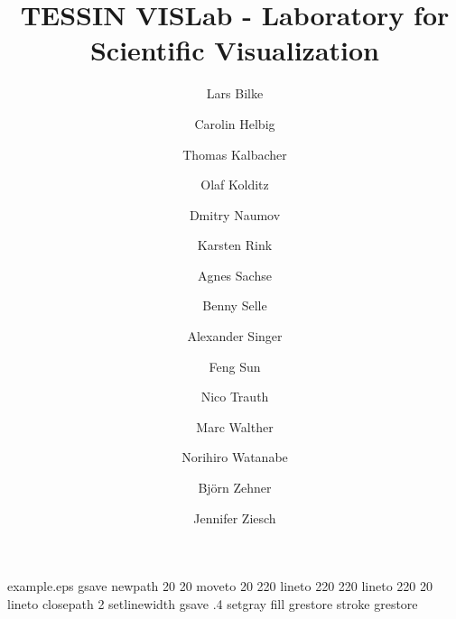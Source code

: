 %
%
%
%
%
\begin{filecontents*}{example.eps}
gsave
newpath
  20 20 moveto
  20 220 lineto
  220 220 lineto
  220 20 lineto
closepath
2 setlinewidth
gsave
  .4 setgray fill
grestore
stroke
grestore
\end{filecontents*}
%
\RequirePackage{fix-cm}
%
\documentclass[twocolumn]{svjour3}          %
%
\smartqed  %
%
\usepackage{graphicx}
%
%
\usepackage{url}

%
%
%


\title{TESSIN VISLab - Laboratory for Scientific Visualization%
}


\author{Lars Bilke         \and
        Carolin Helbig     \and
        Thomas Kalbacher   \and
        Olaf Kolditz       \and
        Dmitry Naumov      \and
        Karsten Rink       \and
        Agnes Sachse       \and
        Benny Selle        \and
        Alexander Singer   \and
        Feng Sun           \and
        Nico Trauth        \and
        Marc Walther       \and
        Norihiro Watanabe  \and
        Bj\"orn Zehner     \and
        Jennifer Ziesch
}

